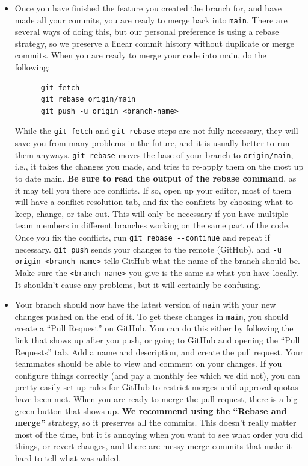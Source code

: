 \begin{enumerate}
\begin{itemize}
    \item Once you have finished the feature you created the branch for, and have made all your commits, you are ready to merge back into \verb|main|. There are several ways of doing this, but our personal preference is using a rebase strategy, so we preserve a linear commit history without duplicate or merge commits. When you are ready to merge your code into main, do the following:
    \begin{verbatim}
      git fetch
      git rebase origin/main
      git push -u origin <branch-name> \end{verbatim}
    While the \verb|git fetch| and \verb|git rebase| steps are not fully necessary, they will save you from many problems in the future, and it is usually better to run them anyways. \verb|git rebase| moves the base of your branch to \verb|origin/main|, i.e., it takes the changes you made, and tries to re-apply them on the most up to date main. \textbf{Be sure to read the output of the rebase command}, as it may tell you there are conflicts. If so, open up your editor, most of them will have a conflict resolution tab, and fix the conflicts by choosing what to keep, change, or take out. This will only be necessary if you have multiple team members in different branches working on the same part of the code. Once you fix the conflicts, run \verb|git rebase --continue| and repeat if necessary. \verb|git push| sends your changes to the remote (GitHub), and \verb|-u origin <branch-name>| tells GitHub what the name of the branch should be. Make sure the \verb|<branch-name>| you give is the same as what you have locally. It shouldn't cause any problems, but it will certainly be confusing.
    \item Your branch should now have the latest version of \verb|main| with your new changes pushed on the end of it. To get these changes in \verb|main|, you should create a ``Pull Request'' on GitHub. You can do this either by following the link that shows up after you push, or going to GitHub and opening the ``Pull Requests'' tab. Add a name and description, and create the pull request. Your teammates should be able to view and comment on your changes. If you configure things correctly (and pay a monthly fee which we did not), you can pretty easily set up rules for GitHub to restrict merges until approval quotas have been met. When you are ready to merge the pull request, there is a big green button that shows up. \textbf{We recommend using the ``Rebase and merge''} strategy, so it preserves all the commits. This doesn't really matter most of the time, but it is annoying when you want to see what order you did things, or revert changes, and there are messy merge commits that make it hard to tell what was added.

\end{itemize}
\end{enumerate}
